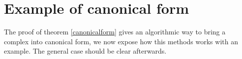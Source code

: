 


%
%
%
%
%
%
%
%


\section{Example of canonical form}

The proof of theorem \ref{canonicalform} gives an
algorithmic way to bring a complex into canonical form, 
we now expose how this methods works with an example. 
The general case should be clear afterwards.



